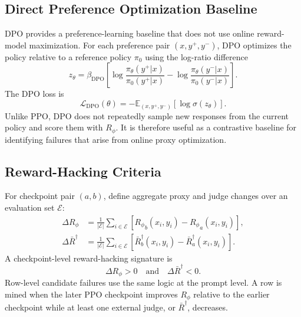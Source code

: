 \documentclass[11pt]{article}
\newcommand{\Rphi}{R_{\phi}}
\begin{document}
\subsection{Direct Preference Optimization Baseline}
DPO provides a preference-learning baseline that does not use online reward-model maximization. For each preference pair $(x,y^+,y^-)$, DPO optimizes the policy relative to a reference policy $\pi_0$ using the log-ratio difference
\begin{equation}
    z_\theta = \beta_{\mathrm{DPO}}
    \left[
    \log\frac{\pi_\theta(y^+|x)}{\pi_0(y^+|x)}
    -
    \log\frac{\pi_\theta(y^-|x)}{\pi_0(y^-|x)}
    \right].
\end{equation}
The DPO loss is
\begin{equation}
    \mathcal{L}_{\mathrm{DPO}}(\theta)
    =-\mathbb{E}_{(x,y^+,y^-)}\left[\log\sigma(z_\theta)\right].
\end{equation}
Unlike PPO, DPO does not repeatedly sample new responses from the current policy and score them with $\Rphi$. It is therefore useful as a contrastive baseline for identifying failures that arise from online proxy optimization.

\subsection{Reward-Hacking Criteria}
For checkpoint pair $(a,b)$, define aggregate proxy and judge changes over an evaluation set $\mathcal{E}$:
\begin{align}
    \Delta \Rphi &= \frac{1}{|\mathcal{E}|}\sum_{i\in\mathcal{E}}
    \left[{\Rphi}_b(x_i,y_i)-{\Rphi}_a(x_i,y_i)\right],\\
    \Delta \bar R^\dagger &= \frac{1}{|\mathcal{E}|}\sum_{i\in\mathcal{E}}
    \left[\bar R^\dagger_b(x_i,y_i)-\bar R^\dagger_a(x_i,y_i)\right].
\end{align}
A checkpoint-level reward-hacking signature is
\begin{equation}
    \Delta \Rphi>0 \quad \text{and} \quad \Delta \bar R^\dagger<0.
\end{equation}
Row-level candidate failures use the same logic at the prompt level. A row is mined when the later PPO checkpoint improves $\Rphi$ relative to the earlier checkpoint while at least one external judge, or $\bar R^\dagger$, decreases.
\end{document}
